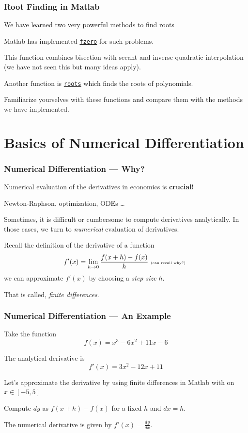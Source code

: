 \documentclass[11pt,xcolor={svgnames},aspectratio=169,usepdftitle=false]{beamer}
\let\toneitemize\itemize
\let\ttwoitemize\enditemize
\renewenvironment{itemize}{\toneitemize\addtolength{\itemsep}{0.7\baselineskip}}{\ttwoitemize}
\begin{document}
\begin{frame}
  \frametitle{Root Finding in Matlab}
\begin{itemize}
  \item We have learned two very powerful methods to find roots
  \item Matlab has implemented \href{https://www.mathworks.com/help/matlab/ref/fzero.html}{\texttt{fzero}} for such problems.
  \item This function combines bisection with secant and inverse quadratic interpolation (we have not seen this but many ideas apply).
  \item Another function is \href{https://www.mathworks.com/help/matlab/ref/roots.html}{\texttt{roots}} which finds the roots of polynomials.
  \item Familiarize yourselves with these functions and compare them with the methods we have implemented.
\end{itemize}
\end{frame}

\section{Basics of Numerical Differentiation}

\begin{frame}
  \frametitle{Numerical Differentiation --- Why?}
\begin{itemize}
  \item Numerical evaluation of the derivatives in economics is \alert{\textbf{crucial!}}
  \begin{itemize}
    \item Newton-Raphson, optimization, ODEs \ldots
  \end{itemize}
  \item Sometimes, it is difficult or cumbersome to compute derivatives analytically. In those cases, we turn to \textit{numerical} evaluation of derivatives.
  \item Recall the definition of the derivative of a function
  \[
  f'(x) = \lim_{h\rightarrow 0} \frac{f(x+h) - f(x)}{h} \text{ \tiny (can recall why?) }
  \]
  we can approximate $f'(x)$ by choosing a \textit{step size} $h$.
  \item That is called, \textit{finite differences}.
\end{itemize}
\end{frame}

\begin{frame}
  \frametitle{Numerical Differentiation --- An Example}
Take the function 
\[
f(x) = x^3 - 6x^2 + 11x - 6
\]
\begin{itemize}
  \item The analytical derivative is 
  \[
  f'(x) = 3x^2 - 12x + 11
  \]
  \item Let's approximate the derivative by using finite differences in Matlab with on $x\in [-5,5]$
  \item Compute $dy$ as $f(x+h) - f(x)$ for a fixed $h$ and $dx = h$.
  \item The numerical derivative is given by $f'(x) = \frac{dy}{dx}$.
\end{itemize}
\end{frame}
\end{document}

